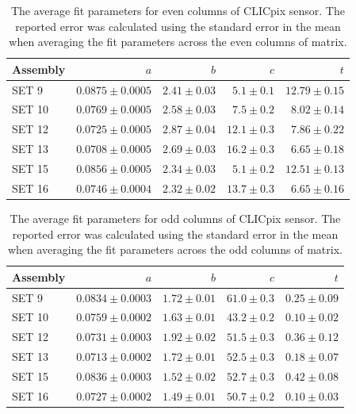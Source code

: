 \begin{table}[h!]
\centering
\begin{tabular}{ l r r r r}
\hline
Assembly & $a$ & $b$ & $c$ & $t$ \\ 
\hline
SET 9   & $0.0875 \pm 0.0005$ & $2.41 \pm 0.03$ & $5.1 \pm 0.1$ & $12.79 \pm 0.15$ \\
SET 10 & $0.0769 \pm 0.0005$ & $2.58 \pm 0.03$ & $7.5 \pm 0.2$ & $8.02 \pm 0.14$ \\
SET 12 & $0.0725 \pm 0.0005$ & $2.87 \pm 0.04$ & $12.1 \pm 0.3$ & $7.86 \pm 0.22$  \\
SET 13 & $0.0708 \pm 0.0005$ & $2.69 \pm 0.03$ & $16.2 \pm 0.3$ & $6.65 \pm 0.18$ \\
SET 15 & $0.0856 \pm 0.0005$ & $2.34 \pm 0.03$ & $5.1 \pm 0.2$ & $12.51 \pm 0.13$ \\
SET 16 & $0.0746 \pm 0.0004$ & $2.32 \pm 0.02$ & $13.7 \pm 0.3$ & $6.65\pm 0.16$ \\
\hline
\end{tabular}
\caption[The average fit parameters for even columns of CLICpix sensor.  The reported error was calculated using the standard error in the mean when averaging the fit parameters across the even columns of matrix.]{The average fit parameters for even columns of CLICpix sensor.  The reported error was calculated using the standard error in the mean when averaging the fit parameters across the even columns of matrix.}
\label{table:clicpixfitparamseven}
\end{table}

\begin{table}[h!]
\centering
\begin{tabular}{ l r r r r}
\hline
Assembly & $a$ & $b$ & $c$ & $t$ \\ 
\hline
SET 9   & $0.0834 \pm 0.0003$ & $1.72 \pm 0.01$ & $61.0 \pm 0.3$ & $0.25 \pm 0.09$ \\
SET 10 & $0.0759 \pm 0.0002$ & $1.63 \pm 0.01$ & $43.2 \pm 0.2$ & $0.10 \pm 0.02$ \\
SET 12 & $0.0731 \pm 0.0003$ & $1.92 \pm 0.02$ & $51.5 \pm 0.3$ & $0.36 \pm 0.12$ \\
SET 13 & $0.0713 \pm 0.0002$ & $1.72 \pm 0.01$ & $52.5 \pm 0.3$ & $0.18 \pm 0.07$ \\
SET 15 & $0.0836 \pm 0.0003$ & $1.52 \pm 0.02$ & $52.7 \pm 0.3$ & $0.42 \pm 0.08$ \\
SET 16  & $0.0727 \pm 0.0002$ & $1.49 \pm 0.01$ & $50.7 \pm 0.2$ & $0.10 \pm 0.03$ \\
\hline
\end{tabular}
\caption[The average fit parameters for odd columns of CLICpix sensor.  The reported error was calculated using the standard error in the mean when averaging the fit parameters across the odd columns of matrix.]{The average fit parameters for odd columns of CLICpix sensor.  The reported error was calculated using the standard error in the mean when averaging the fit parameters across the odd columns of matrix.}\label{table:clicpixfitparamsodd}
\end{table}


